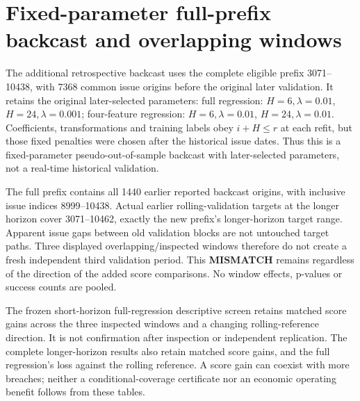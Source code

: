 \documentclass[11pt,a4paper]{article}
\begin{document}
\section{Fixed-parameter full-prefix backcast and overlapping windows}\label{sup:v8-backcast}

The additional retrospective backcast uses the complete eligible prefix
3071--10438, with 7368 common issue origins before the original later
validation. It retains the original later-selected parameters: full regression: \(H=6,\lambda=0.01\), \(H=24,\lambda=0.001\); four-feature regression: \(H=6,\lambda=0.01\), \(H=24,\lambda=0.01\).
Coefficients, transformations and training labels obey \(i+H\le r\) at each
refit, but those fixed penalties were chosen after the historical issue dates.
Thus this is a fixed-parameter pseudo-out-of-sample backcast with later-selected
parameters, not a real-time historical validation.

The full prefix contains all 1440 earlier reported backcast origins,
with inclusive issue indices 8999--10438.
Actual earlier rolling-validation targets at the longer horizon cover 3071--10462,
exactly the new prefix's longer-horizon target range. Apparent issue gaps between old validation blocks
are not untouched target paths. Three displayed overlapping/inspected windows
therefore do not create a fresh independent third validation period. This
\textbf{MISMATCH} remains regardless of the direction of the added score
comparisons. No window effects, p-values or success counts are pooled.




The frozen short-horizon full-regression descriptive screen retains matched
score gains across the three inspected windows and a changing rolling-reference
direction. It is not confirmation after inspection or independent replication.
The complete longer-horizon results also retain matched score gains, and the
full regression's loss against the rolling reference. A score gain can coexist
with more breaches; neither a conditional-coverage certificate nor an economic
operating benefit follows from these tables.
\end{document}
